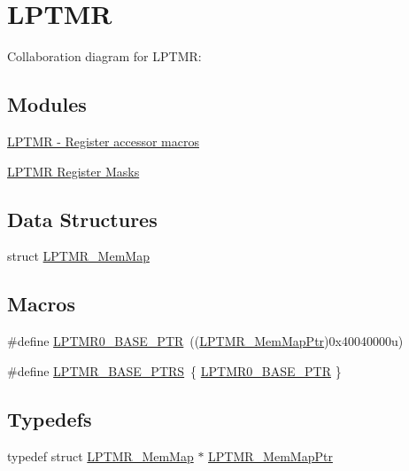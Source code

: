 \hypertarget{group___l_p_t_m_r___peripheral}{}\section{L\+P\+T\+MR}
\label{group___l_p_t_m_r___peripheral}
Collaboration diagram for L\+P\+T\+MR\+:
\subsection*{Modules}
\begin{DoxyCompactItemize}
\item 
\hyperlink{group___l_p_t_m_r___register___accessor___macros}{L\+P\+T\+M\+R -\/ Register accessor macros}
\item 
\hyperlink{group___l_p_t_m_r___register___masks}{L\+P\+T\+M\+R Register Masks}
\end{DoxyCompactItemize}
\subsection*{Data Structures}
\begin{DoxyCompactItemize}
\item 
struct \hyperlink{struct_l_p_t_m_r___mem_map}{L\+P\+T\+M\+R\+\_\+\+Mem\+Map}
\end{DoxyCompactItemize}
\subsection*{Macros}
\begin{DoxyCompactItemize}
\item 
\#define \hyperlink{group___l_p_t_m_r___peripheral_ga90a9194151ad11b422bcab162e797eda}{L\+P\+T\+M\+R0\+\_\+\+B\+A\+S\+E\+\_\+\+P\+TR}~((\hyperlink{group___l_p_t_m_r___peripheral_ga765226e2eeb35160c12820d4a2541320}{L\+P\+T\+M\+R\+\_\+\+Mem\+Map\+Ptr})0x40040000u)
\item 
\#define \hyperlink{group___l_p_t_m_r___peripheral_gac92660dedc63be48d689d43efc9f2c82}{L\+P\+T\+M\+R\+\_\+\+B\+A\+S\+E\+\_\+\+P\+T\+RS}~\{ \hyperlink{group___l_p_t_m_r___peripheral_ga90a9194151ad11b422bcab162e797eda}{L\+P\+T\+M\+R0\+\_\+\+B\+A\+S\+E\+\_\+\+P\+TR} \}
\end{DoxyCompactItemize}
\subsection*{Typedefs}
\begin{DoxyCompactItemize}
\item 
typedef struct \hyperlink{struct_l_p_t_m_r___mem_map}{L\+P\+T\+M\+R\+\_\+\+Mem\+Map} $\ast$ \hyperlink{group___l_p_t_m_r___peripheral_ga765226e2eeb35160c12820d4a2541320}{L\+P\+T\+M\+R\+\_\+\+Mem\+Map\+Ptr}
\end{DoxyCompactItemize}


